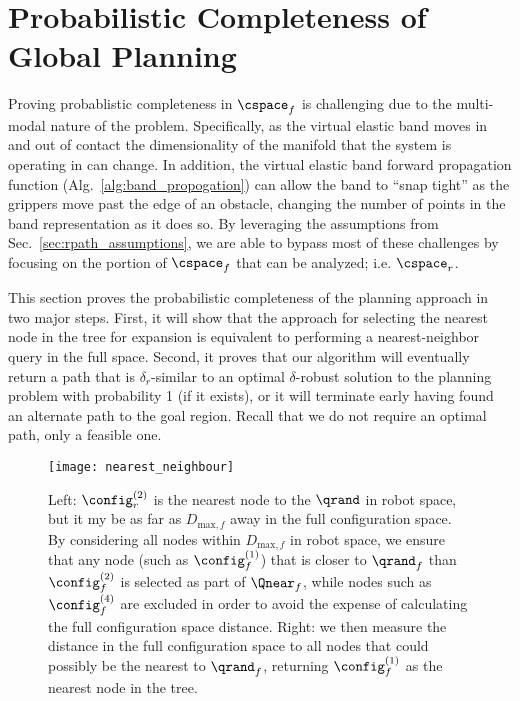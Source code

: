\section{Probabilistic Completeness of Global Planning}
\label{sec:analysis}



Proving probablistic completeness in $\cspace_f$ is challenging due to the multi-modal nature of the problem. Specifically, as the virtual elastic band moves in and out of contact the dimensionality of the manifold that the system is operating in can change. In addition, the virtual elastic band forward propagation function (Alg.~\ref{alg:band_propogation}) can allow the band to ``snap tight'' as the grippers move past the edge of an obstacle, changing the number of points in the band representation as it does so. By leveraging the assumptions from Sec.~\ref{sec:rpath_assumptions}, we are able to bypass most of these challenges by focusing on the portion of $\cspace_f$ that can be analyzed; i.e. $\cspace_r$.



This section proves the probabilistic completeness of the planning approach in two major steps.  First, it will show that the approach for selecting the nearest node in the tree for expansion is equivalent to performing a nearest-neighbor query in the full space.  Second, it proves that our algorithm will eventually return a path that is $\delta_r$-similar to an optimal $\delta$-robust solution to the planning problem with probability 1 (if it exists), or it will terminate early having found an alternate path to the goal region. Recall that we do not require an optimal path, only a feasible one.


\begin{figure}
    \centering
    \texttt{[image: nearest\_neighbour]}
    \caption{Left: $\config_r^{(2)}$ is the nearest node to the $\qrand$ in robot space, but it my be as far as $D_{\textrm{max}, f}$ away in the full configuration space. By considering all nodes within $D_{\textrm{max}, f}$ in robot space, we ensure that any node (such as $\config_f^{(1)}$) that is closer to $\qrand_f$ than $\config_f^{(2)}$ is selected as part of $\Qnear_f$, while nodes such as $\config_f^{(4)}$ are excluded in order to avoid the expense of calculating the full configuration space distance. Right: we then measure the distance in the full configuration space to all nodes that could possibly be the nearest to $\qrand_f$, returning $\config_f^{(1)}$ as the nearest node in the tree.}
    \label{fig:nearest}
\end{figure}






